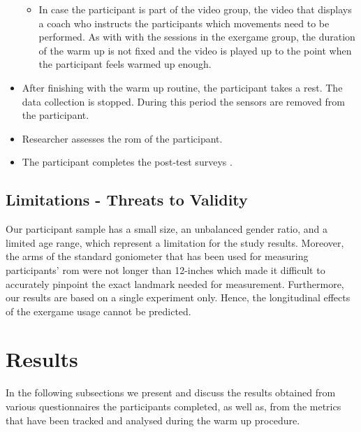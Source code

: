 \begin{itemize}
\begin{itemize}
\item  In case the participant is part of the video group, the video that displays a coach who instructs the participants which movements need to be performed. As with with the sessions in the exergame group, the duration of the warm up is not fixed and the video is played up to the point when the participant feels warmed up enough.\\
\end{itemize}
\item After finishing with the warm up routine, the participant takes a rest. The data collection is stopped. During this period the sensors are removed from the participant. \item Researcher assesses the \acrshort{rom}  of the participant. 
\item The participant completes the post-test surveys . %
\end{itemize}
\subsection{Limitations - Threats to Validity}
Our participant sample has a small size, an unbalanced gender ratio, and a limited age range, which represent a limitation for the study results. Moreover, the arms of the standard goniometer that has been used for measuring participants' \acrshort{rom} were not longer than 12-inches which made it difficult to accurately pinpoint the exact landmark needed for measurement. Furthermore, our results are based on a single experiment only. Hence, the longitudinal effects of the exergame usage cannot be predicted. 
\section{Results}
In the following subsections we present and discuss the results obtained from various questionnaires the participants completed, as well as, from the metrics that have been tracked and analysed during the warm up procedure.\pagebreak
